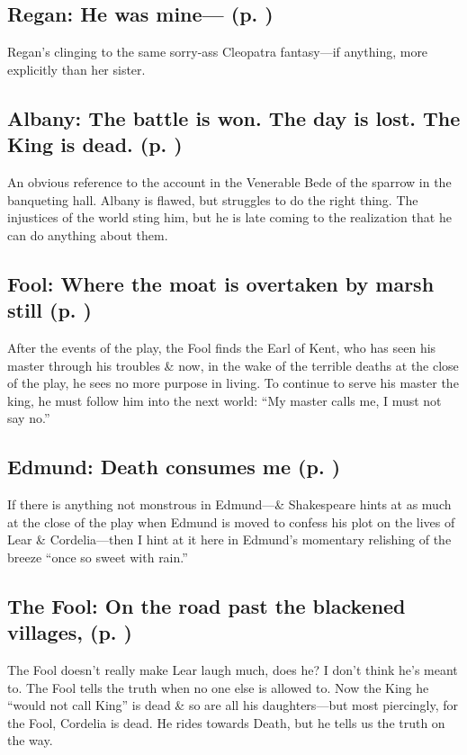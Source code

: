 \subsection*{Regan: He was mine--- (p. \pageref{ch:lear_bn})}
Regan's clinging to the same sorry-ass Cleopatra fantasy---if anything, more explicitly than her sister.

\subsection*{Albany: The battle is won. The day is lost. The King is dead. (p. \pageref{ch:lear_bo})}
An obvious reference to the account in the Venerable Bede of the sparrow in the banqueting hall. Albany is flawed, but struggles to do the right thing. The injustices of the world sting him, but he is late coming to the realization that he can do anything about them.

\subsection*{Fool: Where the moat is overtaken by marsh still (p. \pageref{ch:lear_bp})}
After the events of the play, the Fool finds the Earl of Kent, who has seen his master through his troubles \& now, in the wake of the terrible deaths at the close of the play, he sees no more purpose in living. To continue to serve his master the king, he must follow him into the next world: ``My master calls me, I must not say no.''

\subsection*{Edmund: Death consumes me (p. \pageref{ch:lear_bq})}
If there is anything not monstrous in Edmund---\& Shakespeare hints at as much at the close of the play when Edmund is moved to confess his plot on the lives of Lear \& Cordelia---then I hint at it here in Edmund's momentary relishing of the breeze ``once so sweet with rain.''

\subsection*{The Fool: On the road past the blackened villages, (p. \pageref{ch:lear_br})}
The Fool doesn't really make Lear laugh much, does he? I don't think he's meant to. The Fool tells the truth when no one else is allowed to. Now the King he ``would not call King'' is dead \& so are all his daughters---but most piercingly, for the Fool, Cordelia is dead. He rides towards Death, but he tells us the truth on the way.

